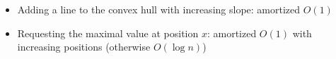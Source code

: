 \begin{itemize}
	\item Adding a line to the convex hull with increasing slope: amortized $O(1)$
  \item Requesting the maximal value at position $x$: amortized $O(1)$ with increasing positions (otherwise $O(\log{n})$)
\end{itemize}
